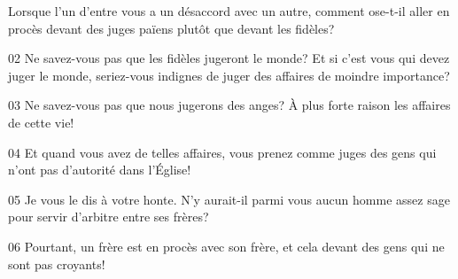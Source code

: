 Lorsque l’un d’entre vous a un désaccord avec un autre, comment ose-t-il aller en procès devant des juges païens plutôt que devant les fidèles?

02 Ne savez-vous pas que les fidèles jugeront le monde? Et si c’est vous qui devez juger le monde, seriez-vous indignes de juger des affaires de moindre importance?

03 Ne savez-vous pas que nous jugerons des anges? À plus forte raison les affaires de cette vie!

04 Et quand vous avez de telles affaires, vous prenez comme juges des gens qui n’ont pas d’autorité dans l’Église!

05 Je vous le dis à votre honte. N’y aurait-il parmi vous aucun homme assez sage pour servir d’arbitre entre ses frères?

06 Pourtant, un frère est en procès avec son frère, et cela devant des gens qui ne sont pas croyants!
